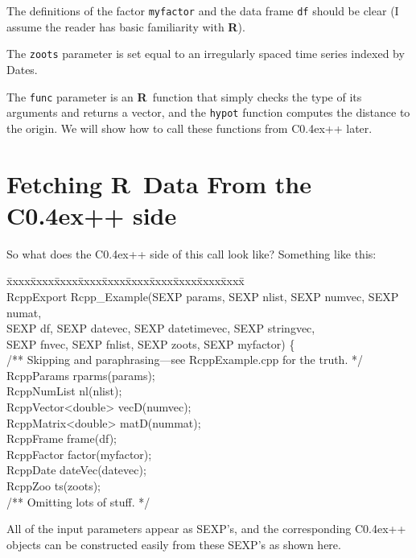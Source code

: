 \documentclass{article}
\newenvironment{program}{\ttfamily\begin{tabbing}
\=xxxx\=xxxx\=xxxx\=xxxx\=xxxx\=xxxx\=xxxx\=xxxx\=xxxx\=xxxx\= \+ \kill \\
}{\end{tabbing}}
\def\C++{C{\raise 0.4ex\hbox{\tiny ++}}}
\newcommand{\R}{{\bf R}}
\begin{document}
The definitions of the factor {\tt myfactor} and the data frame {\tt df}
should be clear (I assume the reader has basic familiarity with \R).

The {\tt zoots} parameter is set equal to an irregularly spaced
time series indexed by Dates.

The {\tt func} parameter is an \R\ function that simply checks the type
of its arguments and returns a vector, and the {\tt hypot} function
computes the distance to the origin. We will show how to call these
functions from \C++ later.

\section{Fetching \R\ Data From the \C++ side}

So what does the \C++ side of this call look like? Something like
this:
\begin{program}
RcppExport Rcpp\_Example(SEXP params, SEXP nlist, SEXP numvec, SEXP numat,\\
\>\> SEXP df, SEXP datevec, SEXP datetimevec, SEXP stringvec,\\
\>\> SEXP fnvec, SEXP fnlist, SEXP zoots, SEXP myfactor) \{\\
\>\> /** Skipping and paraphrasing---see RcppExample.cpp for the truth. */\\
\>\> RcppParams rparms(params);\\
\>\> RcppNumList nl(nlist);\\
\>\> RcppVector<double> vecD(numvec);\\
\>\> RcppMatrix<double> matD(nummat);\\
\>\> RcppFrame frame(df);\\
\>\> RcppFactor factor(myfactor);\\
\>\> RcppDate dateVec(datevec);\\
\>\> RcppZoo  ts(zoots); \\
\>\> /** Omitting lots of stuff. */
\end{program}
All of the input parameters appear as SEXP's, and the corresponding
\C++ objects can be constructed easily from these SEXP's as shown 
here.
\end{document}
